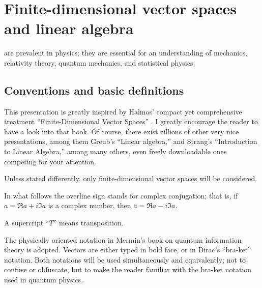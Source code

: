 \chapter{Finite-dimensional vector spaces and linear algebra}
\label{ch:lvs}

 are prevalent in physics;
they are essential for an understanding
of mechanics, relativity theory, quantum mechanics, and statistical physics.

\section{Conventions and basic definitions}



This presentation is greatly inspired
by Halmos' compact yet comprehensive treatment
``Finite-Dimensional Vector Spaces'' \cite{halmos-vs}.
I greatly encourage the reader to have a look into that book.
Of course, there exist zillions of other very nice presentations, among them
Greub's ``Linear algebra,'' and
Strang's ``Introduction to Linear Algebra,''
among many others, even freely downloadable  ones
\cite{Greub75,Strang:2009:ILA,Homes-rorres,lipschutz:schaul-la,Hefferon}
competing for your attention.

Unless stated differently, only
finite-dimensional vector spaces will be considered.

In what follows
the overline sign stands for complex conjugation; that is,
if
${a}= \Re a +i\Im a $ is a complex number, then
$\overline{a}= \Re a -i\Im a$.

A supercript ``$T$'' means transposition.

The physically oriented notation in Mermin's book on
quantum information theory \cite{mermin-04,mermin-07} is adopted.
Vectors are either typed in bold face, or in Dirac's ``bra-ket'' notation\cite{dirac}.
Both notations will be used simultaneously and equivalently;
not to confuse or obfuscate, but to make  the reader familiar with the bra-ket
notation used in quantum physics.

